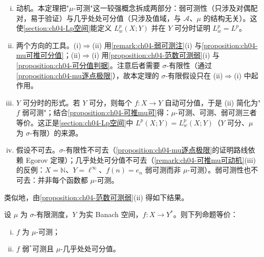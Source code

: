 \documentclass[../../main.tex]{subfiles}%
\begin{document}
\begin{remark}\label{remark:ch04-Pettis动机}
\begin{enumerate}[(i)]
\item 动机。本定理把"$\mu$-可测"这一较强概念拆成两部分：弱可测性（只涉及对偶配对，易于验证）与几乎处处可分值（只涉及值域，与 $\mathcal{A}$、$\mu$ 的结构无关）。这使\cref{section:ch04-Lp空间}能定义 $L^p_w(X;Y)$ 并在 $Y$ 可分时证明 $L^p_w=L^p$。
\item 两个方向的工具。(i)$\Rightarrow$(ii) 用\cref{remark:ch04-弱可测注}(i) 与\cref{proposition:ch04-mu可推可分值}；(ii)$\Rightarrow$(i) 用\cref{proposition:ch04-范数可测弱}(i) 与\cref{proposition:ch04-可分值判据}。注意后者需要 $\sigma$-有限性（通过\cref{proposition:ch04-mu逐点极限}），故本定理的 $\sigma$-有限假设只在 (ii)$\Rightarrow$(i) 中起作用。
\item $Y$ 可分时的形式。若 $Y$ 可分，则每个 $f:X\to Y$ 自动可分值，于是 (ii) 简化为"$f$ 弱可测"；结合\cref{proposition:ch04-可推mu可}得：$\mu$-可测、可测、弱可测三者等价。这正是\cref{section:ch04-Lp空间}中 $L^p(X;Y)=L^p_w(X;Y)$（$Y$ 可分、$\mu$ 为 $\sigma$-有限）的来源。
\item 假设不可去。$\sigma$-有限性不可去（\cref{proposition:ch04-mu逐点极限}的证明路线依赖 Egorov 定理）；几乎处处可分值不可去（\cref{remark:ch04-可推mu可动机}(iii) 的反例：$X=\mathbb{N}$、$Y=\ell^\infty$、$f(n)=e_n$ 弱可测而非 $\mu$-可测）。弱可测性也不可去：并非每个函数都 $\mu$-可测。
\end{enumerate}
\end{remark}

类似地，由\cref{proposition:ch04-范数可测弱}(ii) 得如下结果。

\begin{proposition}\label{proposition:ch04-弱星等价}
设 $\mu$ 为 $\sigma$-有限测度，$Y$ 为实 Banach 空间，$f:X\to Y^*$。则下列命题等价：
\begin{enumerate}[(i)]
\item\label{item:ch04-弱星等价-i} $f$ 为 $\mu$-可测；
\item\label{item:ch04-弱星等价-ii} $f$ 弱$^*$可测且 $\mu$-几乎处处可分值。
\end{enumerate}
\end{proposition}
\end{document}
